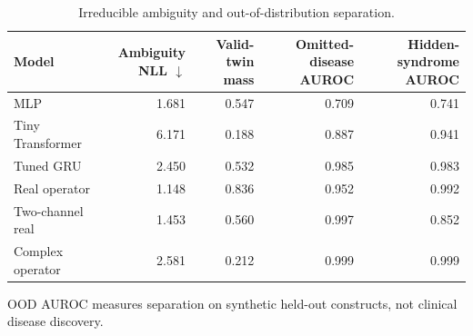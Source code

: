 \begin{table}[t]
\centering
\caption{Irreducible ambiguity and out-of-distribution separation.}
\label{tab:uncertainty_ood}
\begin{tabular}{lrrrr}
\toprule
Model & Ambiguity NLL $\downarrow$ & Valid-twin mass & Omitted-disease AUROC & Hidden-syndrome AUROC \\
\midrule
MLP & 1.681 & 0.547 & 0.709 & 0.741 \\
Tiny Transformer & 6.171 & 0.188 & 0.887 & 0.941 \\
Tuned GRU & 2.450 & 0.532 & 0.985 & 0.983 \\
Real operator & 1.148 & 0.836 & 0.952 & 0.992 \\
Two-channel real & 1.453 & 0.560 & 0.997 & 0.852 \\
Complex operator & 2.581 & 0.212 & 0.999 & 0.999 \\
\bottomrule
\end{tabular}
\begin{minipage}{0.96\linewidth}\footnotesize OOD AUROC measures separation on synthetic held-out constructs, not clinical disease discovery.\end{minipage}
\end{table}
